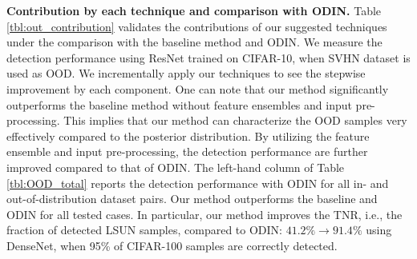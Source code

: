 \documentclass{article}
\begin{document}
{\bf Contribution by each technique and comparison with ODIN.} 
Table \ref{tbl:out_contribution} validates the contributions of our suggested techniques under the comparison with the baseline method and ODIN. 
We measure the detection performance using ResNet trained on CIFAR-10, when SVHN dataset is used as OOD.
We incrementally apply our techniques to see the stepwise improvement by each component.
One can note that our method significantly outperforms the baseline method without feature ensembles and input pre-processing.
This implies that our method can characterize the OOD samples very effectively compared to the posterior distribution. 
By utilizing the feature ensemble and input pre-processing,
the detection performance are further improved compared to that of ODIN.
The left-hand column of Table \ref{tbl:OOD_total} reports the detection performance with ODIN for all in- and out-of-distribution dataset pairs.
Our method outperforms the baseline and ODIN for all tested cases.
In particular, our method improves the TNR, i.e., the fraction of detected LSUN samples, compared to ODIN: $41.2\%\rightarrow 91.4\%$ using DenseNet, when 95\% of CIFAR-100 samples are correctly detected.
\end{document}
